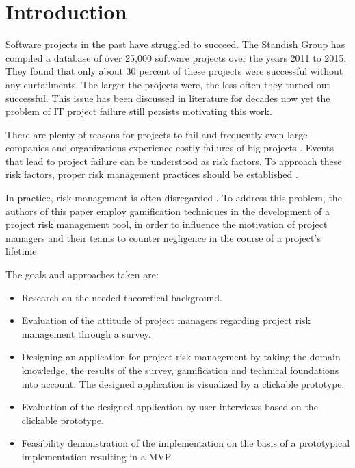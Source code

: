 \chapter{Introduction}
\label{ch:introduction}

Software projects in the past have struggled to succeed. The Standish Group \cite{thestandishgroupinternationalincChaosReport20152015} has compiled a database of over 25,000 software projects over the years 2011 to 2015. They found that only about 30 percent of these projects were successful without any curtailments. The larger the projects were, the less often they turned out successful. This issue has been discussed in literature for decades now yet the problem of IT project failure still persists motivating this work. \cite{thestandishgroupinternationalincChaosReport20152015}

There are plenty of reasons for projects to fail and frequently even large companies and organizations experience costly failures of big projects \cite{dwivediResearchInformationSystems2015}. Events that lead to project failure can be understood as risk factors. To approach these risk factors, proper risk management practices should be established \cite{teschITProjectRisk2007}.

In practice, risk management is often disregarded \cite{kwakProjectRiskManagement2004}. To address this problem, the authors of this paper employ gamification techniques in the development of a project risk management tool, in order to influence the motivation of project managers and their teams to counter negligence in the course of a project’s lifetime.

The goals and approaches taken are:
\begin{itemize}
	\item Research on the needed theoretical background.
	\item Evaluation of the attitude of project managers regarding project risk management through a survey.
	\item Designing an application for project risk management by taking 
	the domain knowledge, the results of the survey, gamification and technical foundations into account. The designed application is visualized by a clickable prototype.
	\item Evaluation of the designed application by user interviews based on the clickable prototype.
	\item Feasibility demonstration of the implementation on the basis of a prototypical implementation resulting in a \ac{MVP}.
\end{itemize}

